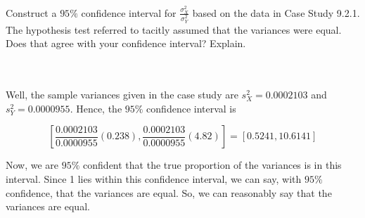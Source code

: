 Construct a $95\%$ confidence interval for $\frac{\sigma_X^2}{\sigma_Y^2}$ based on the data in Case
Study 9.2.1. The hypothesis test referred to tacitly assumed that the variances were equal. Does that
agree with your confidence interval? Explain.\\\\

\begin{solution}\renewcommand{\qedsymbol}{}\ \\
    Well, the sample variances given in the case study are $s_X^2=0.0002103$ and $s_Y^2=0.0000955$.
    Hence, the $95\%$ confidence interval is
    
    $$[\frac{0.0002103}{0.0000955}(0.238), \frac{0.0002103}{0.0000955}(4.82)]=[0.5241, 10.6141]$$
    
    Now, we are $95\%$ confident that the true proportion of the variances is in this interval. Since 1
    lies within this confidence interval, we can say, with $95\%$ confidence, that the variances are
    equal. So, we can reasonably say that the variances are equal.

\end{solution}